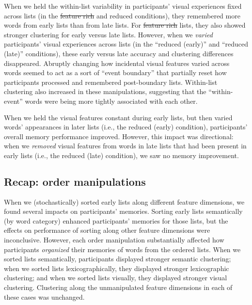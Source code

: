 \documentclass[11pt]{article}
\providecommand{\DIFaddtex}[1]{{\protect\color{blue}\uwave{#1}}} %
\providecommand{\DIFdeltex}[1]{{\protect\color{red}\sout{#1}}}                      %
\providecommand{\DIFaddbegin}{} %
\providecommand{\DIFaddend}{} %
\providecommand{\DIFdelbegin}{} %
\providecommand{\DIFdelend}{} %
\providecommand{\DIFadd}[1]{\texorpdfstring{\DIFaddtex{#1}}{#1}} %
\providecommand{\DIFdel}[1]{\texorpdfstring{\DIFdeltex{#1}}{}} %
\newcommand{\DIFscaledelfig}{0.5}
\newlength{\DIFdelgraphicswidth} %
\newlength{\DIFdelgraphicsheight} %
\newcommand{\DIFaddincludegraphics}[2][]{{\color{blue}\fbox{\DIFOincludegraphics[#1]{#2}}}} %
\newcommand{\DIFdelincludegraphics}[2][]{%
\sbox{\DIFdelgraphicsbox}{\DIFOincludegraphics[#1]{#2}}%
\settoboxwidth{\DIFdelgraphicswidth}{\DIFdelgraphicsbox} %
\settoboxtotalheight{\DIFdelgraphicsheight}{\DIFdelgraphicsbox} %
\scalebox{\DIFscaledelfig}{%
\parbox[b]{\DIFdelgraphicswidth}{\usebox{\DIFdelgraphicsbox}\\[-\baselineskip] \rule{\DIFdelgraphicswidth}{0em}}\llap{\resizebox{\DIFdelgraphicswidth}{\DIFdelgraphicsheight}{%
\setlength{\unitlength}{\DIFdelgraphicswidth}%
\begin{picture}(1,1)%
\thicklines\linethickness{2pt} %
{\color[rgb]{1,0,0}\put(0,0){\framebox(1,1){}}}%
{\color[rgb]{1,0,0}\put(0,0){\line( 1,1){1}}}%
{\color[rgb]{1,0,0}\put(0,1){\line(1,-1){1}}}%
\end{picture}%
}\hspace*{3pt}}} %
} %
\DeclareRobustCommand{\DIFaddbegin}{\DIFOaddbegin \let\includegraphics\DIFaddincludegraphics} %
\DeclareRobustCommand{\DIFaddend}{\DIFOaddend \let\includegraphics\DIFOincludegraphics} %
\DeclareRobustCommand{\DIFdelbegin}{\DIFOdelbegin \let\includegraphics\DIFdelincludegraphics} %
\DeclareRobustCommand{\DIFdelend}{\DIFOaddend \let\includegraphics\DIFOincludegraphics} %
\begin{document}
When we held the within-list variability in participants' visual experiences
fixed across lists (in the \DIFdelbegin \DIFdel{feature rich }\DIFdelend \DIFaddbegin \DIFadd{feature-rich }\DIFaddend and reduced conditions), they
remembered more words from early lists than from late lists. For \DIFdelbegin \DIFdel{feature rich
}\DIFdelend \DIFaddbegin \DIFadd{feature-rich
}\DIFaddend lists, they also showed stronger clustering for early versus late lists.
However, when we \textit{varied} participants' visual experiences across lists
(in the ``reduced (early)'' and ``reduced (late)'' conditions), these early
versus late accuracy and clustering differences disappeared. Abruptly changing
how incidental visual features varied across words seemed to act as a sort of
``event boundary'' that partially reset how participants processed and
remembered post-boundary lists. Within-list clustering also increased in these
manipulations, suggesting that the ``within-event'' words were being more tightly
associated with each other.

When we held the visual features constant during early lists, but then varied
words' appearances in later lists (i.e., the reduced (early) condition),
participants' overall memory performance improved. However, this impact was
directional: when we \textit{removed} visual features from words in late lists
that had been present in early lists (i.e., the reduced (late) condition), we
saw no memory improvement.

\subsection*{Recap: order manipulations}

When we (stochastically) sorted early lists along different feature dimensions,
we found several impacts on participants' memories. Sorting early lists
semantically (by word category) enhanced participants' memories for those
lists, but the effects on performance of sorting along other feature dimensions
were inconclusive. However, each order manipulation substantially affected how
participants \textit{organized} their memories of words from the ordered lists.
When we sorted lists semantically, participants displayed stronger semantic
clustering; when we sorted lists lexicographically, they displayed stronger
lexicographic clustering; and when we sorted lists visually, they displayed
stronger visual clustering. Clustering along the unmanipulated feature
dimensions in each of these cases was unchanged.
\end{document}
